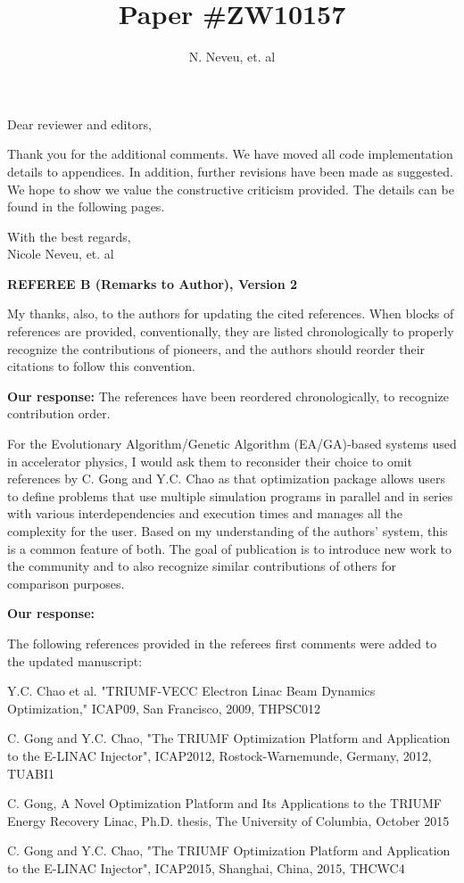 \documentclass{article}
\begin{document}
\title {Paper  \#ZW10157}
\author {N. Neveu, et. al}

\maketitle
Dear reviewer and editors,

Thank you for the additional comments.
We have moved all code implementation details to appendices.
In addition, further revisions have been made as suggested.
We hope to show we value the constructive criticism provided.
The details can be found in the following pages.

With the best regards,  \\[3mm]
 
Nicole Neveu, et. al

\pagebreak

{\bf REFEREE B (Remarks to Author), Version 2}


My thanks, also, to the authors for updating the cited references.
When blocks of references are provided, conventionally, they are
listed chronologically to properly recognize the contributions of
pioneers, and the authors should reorder their citations to follow
this convention. 

{\bf Our response:} {\color{blue} The references have been 
	reordered chronologically, to recognize contribution order.}

For the Evolutionary Algorithm/Genetic Algorithm
(EA/GA)-based systems used in accelerator physics, I would ask them to
reconsider their choice to omit references by C. Gong and Y.C. Chao as
that optimization package allows users to define problems that use
multiple simulation programs in parallel and in series with various
interdependencies and execution times and manages all the complexity
for the user. Based on my understanding of the authors' system, this
is a common feature of both. The goal of publication is to introduce
new work to the community and to also recognize similar contributions
of others for comparison purposes.

{\bf Our response:} {\color{blue} The following references provided in the 
	referees first comments were added to the updated manuscript: 

Y.C. Chao et al. "TRIUMF-VECC Electron Linac Beam Dynamics
Optimization," ICAP09, San Francisco, 2009, THPSC012

C. Gong and Y.C. Chao, "The TRIUMF Optimization Platform and
Application to the E-LINAC Injector", ICAP2012, Rostock-Warnemunde,
Germany, 2012, TUABI1

C. Gong, A Novel Optimization Platform and Its Applications to the
TRIUMF Energy Recovery Linac, Ph.D. thesis, The University of
Columbia, October 2015

C. Gong and Y.C. Chao, "The TRIUMF Optimization Platform and
Application to the E-LINAC Injector", ICAP2015, Shanghai, China, 2015,
THCWC4}
\end{document}
